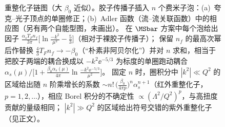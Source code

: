 \begin{figure}[htbp]
\caption{重整化子链图（大 $\beta_0$ 近似）。胶子传播子插入 $n$ 个费米子泡：(a)~夸克--光子顶点的单圈修正；(b)~Adler 函数（流--流关联函数）中的相应图（另有两个自能型图，未画出）。
在 $\MSbar$ 方案中每个泡给出因子 $\frac{\alpha_sT_Fn_f}{3\pi}\big[\ln\frac{-k^2}{\mu^2}-\frac53\big]$（相对于裸胶子传播子）；
保留 $n_f$ 的最高次幂后作替换 $\frac43T_Fn_f\to-\beta_0$（“朴素非阿贝尔化”）并对 $n$ 求和，相当于把胶子两端的耦合换成以 $-k^2\ee^{-5/3}$ 为标度的单圈跑动耦合
$\alpha_s(\mu)\big/\big[1+\frac{\beta_0\alpha_s(\mu)}{4\pi}\ln\frac{-k^2\ee^{-5/3}}{\mu^2}\big]$。
固定 $n$ 时，圈积分中 $|k^2|\ll Q^2$ 的区域给出随 $n$ 阶乘增长的系数 $\sim n!\,\big(\frac{\beta_0}{4\pi p}\big)^n\alpha_s^{n+1}$（红外重整化子，$p=1,2,\dots$），相应 Borel 积分的不确定性 $\propto(\Lambda^2/Q^2)^p$，与高扭度贡献的量级相同；
$|k^2|\gg Q^2$ 的区域给出符号交错的紫外重整化子（见正文）。}
\label{fig:renormalon-chain}
\end{figure}

